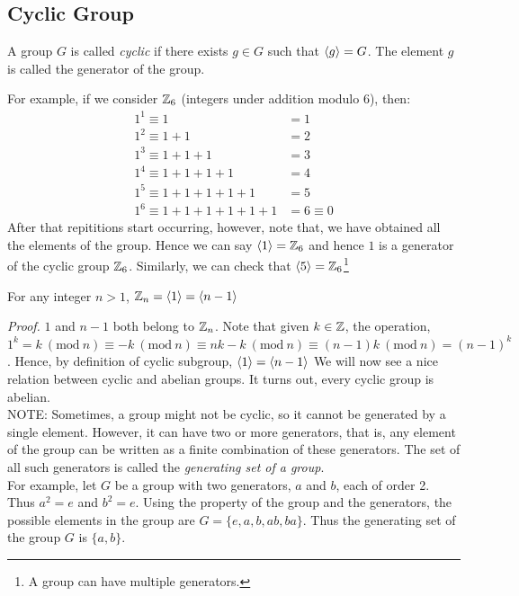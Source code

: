 \subsection{Cyclic Group}
\begin{definition}
    A group $G$ is called \textit{cyclic} if there exists $g\in G$ such that $\left\langle g \right\rangle = G$. The element $g$ is called the generator of the group.
\end{definition}
For example, if we consider $\mathbb{Z}_6$ (integers under addition modulo 6), then:
\begin{align*}
    1^1 \equiv 1 &= 1\\
    1^2 \equiv 1+1 &=2\\ 
   1^3 \equiv 1+1+1 &=3\\  
   1^4 \equiv 1+1+1+1 &=4\\
   1^5 \equiv 1+1+1+1+1 &=5\\
 1^6 \equiv  1+1+1+1+1+1 &=6 \equiv 0
\end{align*}
    After that repititions start occurring, however, note that, we have obtained all the elements of the group. Hence we can say $\left\langle 1 \right\rangle = \mathbb{Z}_6$ and hence $1$ is a generator of the cyclic group $\mathbb{Z}_6$. Similarly, we can check that $\left\langle 5 \right\rangle=\mathbb{Z}_6$\footnote{A group can have multiple generators.}
    \begin{ffact}
    For any integer $n>1$, $\mathbb{Z}_n = \left\langle 1 \right\rangle = \left\langle n-1 \right\rangle$
    \end{ffact}
    \noindent
    \textit{Proof.} $1$ and $n-1$ both belong to $\mathbb{Z}_n$. Note that given $k\in \mathbb{Z}$, the operation, $1^k = k \ (\mathrm{mod}\ n) \equiv -k \ (\mathrm{mod}\ n)\equiv nk-k \ (\mathrm{mod}\ n)\equiv  (n-1)k \ (\mathrm{mod}\ n) = (n-1)^k$. Hence, by definition of cyclic subgroup, $\left\langle 1 \right\rangle = \left\langle n-1 \right\rangle$
    We will now see a nice relation between cyclic and abelian groups. It turns out, every cyclic group is abelian.\\[0.2cm]
    NOTE: Sometimes, a group might not be cyclic, so it cannot be generated by a single element. However, it can have two or more generators, that is, any element of the group can be written as a finite combination of these generators. The set of all such generators is called the \textit{generating set of a group}.\\[0.2cm]
    For example, let $G$ be a group with two generators, $a$ and $b$, each of order 2. Thus $a^2=e$ and $b^2=e$. Using the property of the group and the generators, the possible elements in the group are $G=\{e,a,b,ab,ba\}$. Thus the generating set of the group $G$ is $\{a,b\}$. \\
